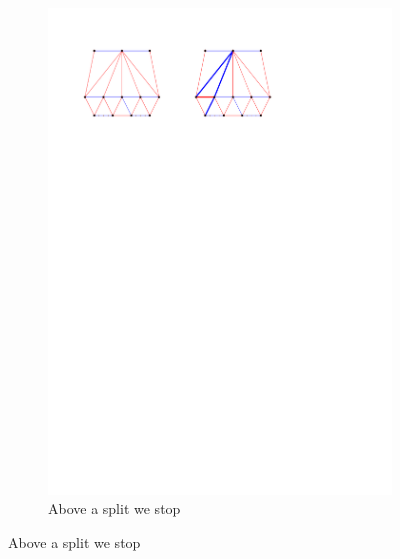 \begin{figure}
\begin{subfigure}[b]{0.45 \textwidth}
    \end{subfigure}
    \centering
    \begin{subfigure}[b]{0.45 \textwidth}
        \includegraphics[width = \textwidth]{topFanFlips/img/split}
        \caption{Above a split we stop}
        \label{fig:fanflip:split}


\end{subfigure}
\end{figure}
